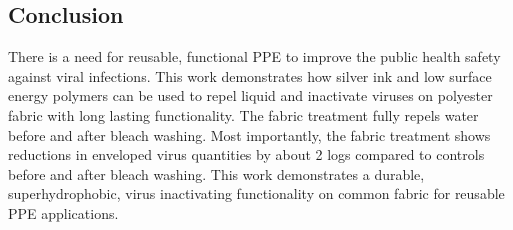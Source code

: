 \documentclass[journal=jacsat,manuscript=article]{achemso}
\begin{document}
\subsection{Conclusion}
There is a need for reusable, functional PPE to improve the public health safety against viral infections. This work demonstrates how %
silver ink and low surface energy polymers can be used to repel liquid and inactivate viruses on polyester fabric with long lasting functionality. The fabric treatment fully repels water before and after bleach washing. Most importantly, the fabric treatment shows reductions in enveloped virus quantities by about 2 logs compared to controls before and after bleach washing. %
This work demonstrates a durable, superhydrophobic, virus inactivating functionality on common fabric for reusable PPE applications.






\end{document}
